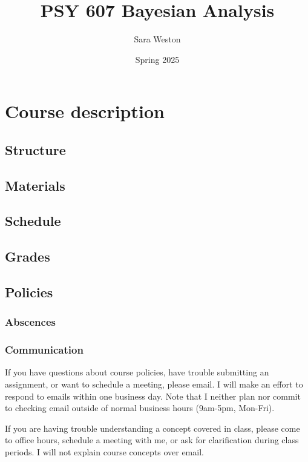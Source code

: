 \documentclass[
]{book}
\title{PSY 607 Bayesian Analysis}
\author{Sara Weston}
\date{Spring 2025}
\begin{document}
\maketitle

{
\setcounter{tocdepth}{1}
\tableofcontents
}
\chapter{Course description}\label{course-description}

\section{Structure}\label{structure}

\section{Materials}\label{materials}

\section{Schedule}\label{schedule}

\section{Grades}\label{grades}

\section{Policies}\label{policies}

\subsection{Abscences}\label{abscences}

\subsection{Communication}\label{communication}

If you have questions about course policies, have trouble submitting an assignment, or want to schedule a meeting, please email. I will make an effort to respond to emails within one business day. Note that I neither plan nor commit to checking email outside of normal business hours (9am-5pm, Mon-Fri).

If you are having trouble understanding a concept covered in class, please come to office hours, schedule a meeting with me, or ask for clarification during class periods. I will not explain course concepts over email.
\end{document}
